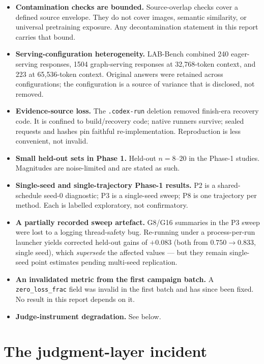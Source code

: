 \begin{itemize}[leftmargin=1.4em,itemsep=3pt]
  \item \textbf{Contamination checks are bounded.} Source-overlap checks cover a
  defined source envelope. They do not cover images, semantic similarity, or
  universal pretraining exposure. Any decontamination statement in this report
  carries that bound.
  \item \textbf{Serving-configuration heterogeneity.} LAB-Bench combined 240
  eager-serving responses, 1504 graph-serving responses at 32{,}768-token context,
  and 223 at 65{,}536-token context. Original answers were retained across
  configurations; the configuration is a source of variance that is disclosed, not
  removed.
  \item \textbf{Evidence-source loss.} The \texttt{.codex-run} deletion removed
  finish-era recovery code. It is confined to build/recovery code; native runners
  survive; sealed requests and hashes pin faithful re-implementation. Reproduction
  is less convenient, not invalid.
  \item \textbf{Small held-out sets in Phase 1.} Held-out $n=8$--$20$ in the
  Phase-1 studies. Magnitudes are noise-limited and are stated as such.
  \item \textbf{Single-seed and single-trajectory Phase-1 results.} P2 is a
  shared-schedule seed-0 diagnostic; P3 is a single-seed sweep; P8 is one
  trajectory per method. Each is labelled exploratory, not confirmatory.
  \item \textbf{A partially recorded sweep artefact.} G8/G16 summaries in the P3
  sweep were lost to a logging thread-safety bug. Re-running under a
  process-per-run launcher yields corrected held-out gains of $+0.083$ (both from
  $0.750\to0.833$, single seed), which \emph{supersede} the affected values --- but
  they remain single-seed point estimates pending multi-seed replication.
  \item \textbf{An invalidated metric from the first campaign batch.} A
  \texttt{zero\_loss\_frac} field was invalid in the first batch and has since been
  fixed. No result in this report depends on it.
  \item \textbf{Judge-instrument degradation.} See below.
\end{itemize}

\section{The judgment-layer incident}


